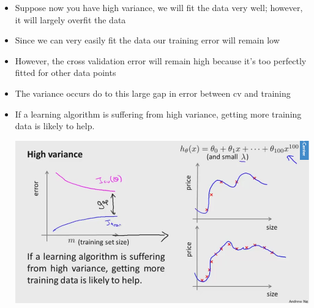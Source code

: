 \begin{itemize}[--]
	\item Suppose now you have high variance, we will fit the data very well; however, it will largely overfit the data
	\item Since we can very easily fit the data our training error will remain low
	\item However, the cross validation error will remain high because it's too perfectly fitted for other data points
	\item The variance occurs do to this large gap in error between cv and training
	\item If a learning algorithm is suffering from high variance, getting more training data is likely to help.
	\begin{center}
		\includegraphics[scale=0.5]{sections/cs229/w7/var.png}
	\end{center}


\end{itemize} 

